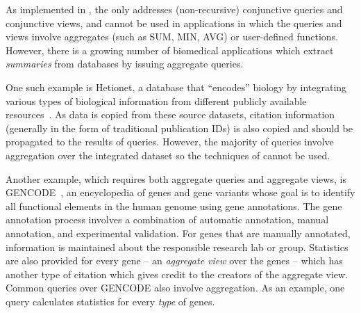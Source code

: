 As implemented in \cite{wu2018data}, the {\rba} only addresses (non-recursive) conjunctive queries and conjunctive views, and cannot be used in applications in which the queries and views involve aggregates (such as SUM, MIN, AVG) or user-defined functions.  However, there is a growing number of biomedical applications which extract \textit{summaries} from data\-bases by issuing aggregate queries.


One such example is Hetionet, a database that ``encodes'' biology by integrating various types of biological information from different publicly available resources~\cite{himmelstein2017systematic}.
As data is copied from these source datasets, citation information (generally in the form of traditional publication IDs) is also copied and should be propagated to the results of queries.
However, the majority of queries involve aggregation over the integrated dataset so the techniques of \cite{wu2018data} cannot be used.

Another example, which requires both aggregate queries and aggregate views, is GENCODE~\cite{harrow2012gencode}, an encyclopedia of genes and gene variants whose goal is to identify all functional elements in the human genome using gene annotations. The gene annotation process involves a combination of automatic annotation, manual annotation, and experimental validation. For genes that are manually annotated, information is maintained about the responsible research lab or group. Statistics are also provided for every gene -- an {\em aggregate view} over the genes -- which has another type of citation which gives credit to the creators of the aggregate view.
Common queries over GENCODE also involve aggregation. As an example, one query calculates statistics for every \textit{type} of genes.

